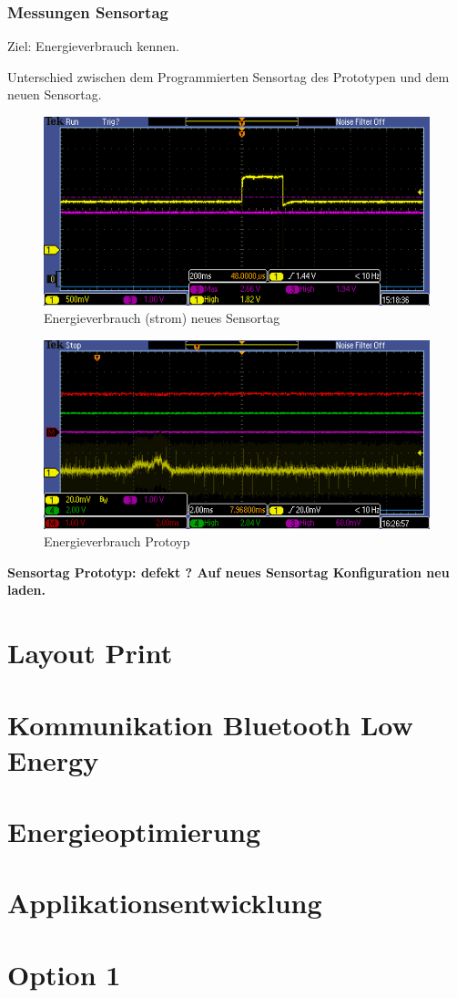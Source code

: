 \pagebreak
\subsubsection{Messungen Sensortag}
Ziel: Energieverbrauch kennen.

Unterschied zwischen dem Programmierten Sensortag des Prototypen und dem neuen Sensortag.

\begin{figure}[h]
\includegraphics[bb=0 300 50 50]{SensortagRuhestrom.PNG}
\caption{Energieverbrauch (strom) neues Sensortag}
\end{figure}

\begin{figure}[h]
\includegraphics[bb=0 550 50 50]{NeuesSensortagSTromverbrauch.PNG}
\caption{Energieverbrauch Protoyp}
\end{figure}

\textbf{Sensortag Prototyp: defekt ? Auf neues Sensortag Konfiguration neu laden.
}


\section{Layout Print}

\section{Kommunikation Bluetooth Low Energy}

\section{Energieoptimierung}



\section{Applikationsentwicklung}

\section{Option 1}






